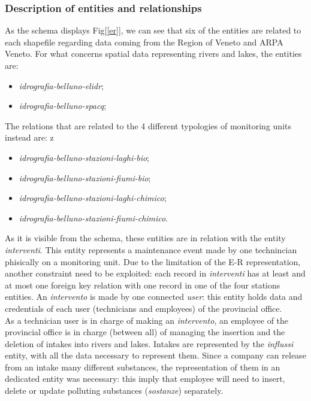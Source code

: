 \subsubsection{Description of entities and relationships}
As the schema displays Fig[\ref{er}], we can see that six of the entities are related to each shapefile regarding data coming from the Region of Veneto and ARPA Veneto.
For what concerns spatial data representing rivers and lakes, the entities are:
\begin{itemize}
    \item \textit{idrografia-belluno-elidr};
    \item \textit{idrografia-belluno-spacq};
\end{itemize}
The relations that are related to the 4 different typologies of monitoring units instead are:
z\begin{itemize}
    \item \textit{idrografia-belluno-stazioni-laghi-bio};
    \item \textit{idrografia-belluno-stazioni-fiumi-bio};
    \item \textit{idrografia-belluno-stazioni-laghi-chimico};
    \item \textit{idrografia-belluno-stazioni-fiumi-chimico}.
\end{itemize}
As it is visible from the schema, these entities are in relation with the entity \textit{interventi}. This entity represents a maintenance event made by one technincian phisically on a monitoring unit. Due to the limitation of the E-R representation, another constraint need to be exploited: each record in \textit{interventi} has at least and at most one foreign key relation with one record in one of the four stations entities.
An \textit{intervento} is made by one connected \textit{user}: this entity holds data and credentials of each user (technicians and employees) of the provincial office. \\
As a technician user is in charge of making an \textit{intervento}, an employee of the provincial office is in charge (between all) of managing the insertion and the deletion of intakes into rivers and lakes. Intakes are represented by the \textit{influssi} entity, with all the data necessary to represent them. Since a company can release from an intake many different substances, the representation of them in an dedicated entity was necessary: this imply that employee will need to insert, delete or update polluting substances (\textit{sostanze}) separately. \\

